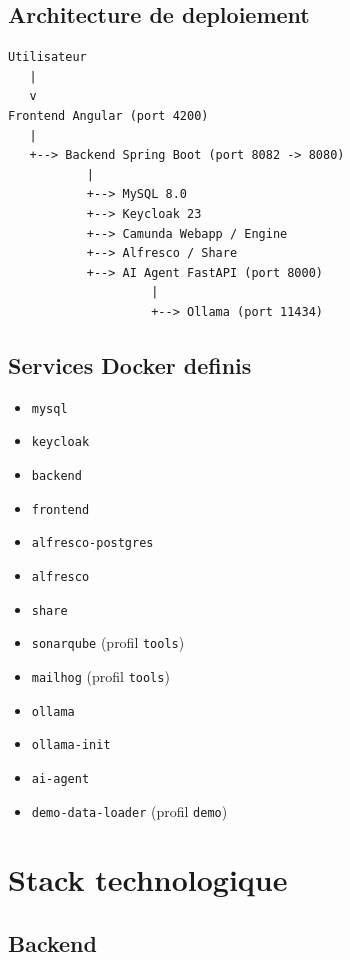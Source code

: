 \documentclass[12pt,a4paper]{article}
\begin{document}
\subsection{Architecture de deploiement}

\begin{lstlisting}
Utilisateur
   |
   v
Frontend Angular (port 4200)
   |
   +--> Backend Spring Boot (port 8082 -> 8080)
           |
           +--> MySQL 8.0
           +--> Keycloak 23
           +--> Camunda Webapp / Engine
           +--> Alfresco / Share
           +--> AI Agent FastAPI (port 8000)
                    |
                    +--> Ollama (port 11434)
\end{lstlisting}

\subsection{Services Docker definis}

\begin{itemize}[leftmargin=1.2cm]
  \item \texttt{mysql}
  \item \texttt{keycloak}
  \item \texttt{backend}
  \item \texttt{frontend}
  \item \texttt{alfresco-postgres}
  \item \texttt{alfresco}
  \item \texttt{share}
  \item \texttt{sonarqube} (profil \texttt{tools})
  \item \texttt{mailhog} (profil \texttt{tools})
  \item \texttt{ollama}
  \item \texttt{ollama-init}
  \item \texttt{ai-agent}
  \item \texttt{demo-data-loader} (profil \texttt{demo})
\end{itemize}

\section{Stack technologique}

\subsection{Backend}
\end{document}
